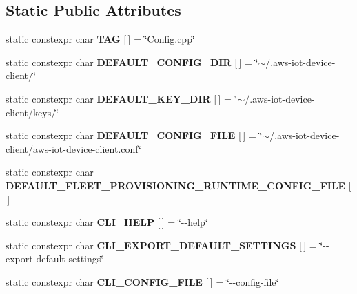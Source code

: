 \subsection*{Static Public Attributes}
\begin{DoxyCompactItemize}
\item 
\mbox{\label{class_aws_1_1_iot_1_1_device_client_1_1_config_a031e68a89ae130b0e057a1bb002c88e1}} 
static constexpr char {\bfseries T\+AG} \mbox{[}$\,$\mbox{]} = \char`\"{}Config.\+cpp\char`\"{}
\item 
\mbox{\label{class_aws_1_1_iot_1_1_device_client_1_1_config_ab371eb8d56601c1e89139b3923c8a510}} 
static constexpr char {\bfseries D\+E\+F\+A\+U\+L\+T\+\_\+\+C\+O\+N\+F\+I\+G\+\_\+\+D\+IR} \mbox{[}$\,$\mbox{]} = \char`\"{}$\sim$/.aws-\/iot-\/device-\/client/\char`\"{}
\item 
\mbox{\label{class_aws_1_1_iot_1_1_device_client_1_1_config_a26fc5b345eaf56c9ef757569b3d512d0}} 
static constexpr char {\bfseries D\+E\+F\+A\+U\+L\+T\+\_\+\+K\+E\+Y\+\_\+\+D\+IR} \mbox{[}$\,$\mbox{]} = \char`\"{}$\sim$/.aws-\/iot-\/device-\/client/keys/\char`\"{}
\item 
\mbox{\label{class_aws_1_1_iot_1_1_device_client_1_1_config_aff1fd25389283318f0a37563b5796448}} 
static constexpr char {\bfseries D\+E\+F\+A\+U\+L\+T\+\_\+\+C\+O\+N\+F\+I\+G\+\_\+\+F\+I\+LE} \mbox{[}$\,$\mbox{]} = \char`\"{}$\sim$/.aws-\/iot-\/device-\/client/aws-\/iot-\/device-\/client.\+conf\char`\"{}
\item 
static constexpr char {\bfseries D\+E\+F\+A\+U\+L\+T\+\_\+\+F\+L\+E\+E\+T\+\_\+\+P\+R\+O\+V\+I\+S\+I\+O\+N\+I\+N\+G\+\_\+\+R\+U\+N\+T\+I\+M\+E\+\_\+\+C\+O\+N\+F\+I\+G\+\_\+\+F\+I\+LE} \mbox{[}$\,$\mbox{]}
\item 
\mbox{\label{class_aws_1_1_iot_1_1_device_client_1_1_config_abfeb64c428bb7ceccb5a7ed41053a736}} 
static constexpr char {\bfseries C\+L\+I\+\_\+\+H\+E\+LP} \mbox{[}$\,$\mbox{]} = \char`\"{}-\/-\/help\char`\"{}
\item 
\mbox{\label{class_aws_1_1_iot_1_1_device_client_1_1_config_aa68ce541f883e9f7d4777b68f2edb073}} 
static constexpr char {\bfseries C\+L\+I\+\_\+\+E\+X\+P\+O\+R\+T\+\_\+\+D\+E\+F\+A\+U\+L\+T\+\_\+\+S\+E\+T\+T\+I\+N\+GS} \mbox{[}$\,$\mbox{]} = \char`\"{}-\/-\/export-\/default-\/settings\char`\"{}
\item 
\mbox{\label{class_aws_1_1_iot_1_1_device_client_1_1_config_a5d750b00b78159cc0d053db72498e7c7}} 
static constexpr char {\bfseries C\+L\+I\+\_\+\+C\+O\+N\+F\+I\+G\+\_\+\+F\+I\+LE} \mbox{[}$\,$\mbox{]} = \char`\"{}-\/-\/config-\/file\char`\"{}
\end{DoxyCompactItemize}
